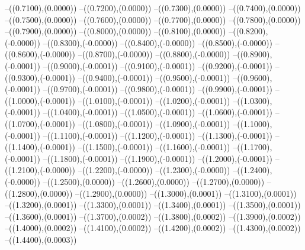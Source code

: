 {	--({\sx*(0.7100)},{\sy*(0.0000)})
	--({\sx*(0.7200)},{\sy*(0.0000)})
	--({\sx*(0.7300)},{\sy*(0.0000)})
	--({\sx*(0.7400)},{\sy*(0.0000)})
	--({\sx*(0.7500)},{\sy*(0.0000)})
	--({\sx*(0.7600)},{\sy*(0.0000)})
	--({\sx*(0.7700)},{\sy*(0.0000)})
	--({\sx*(0.7800)},{\sy*(0.0000)})
	--({\sx*(0.7900)},{\sy*(0.0000)})
	--({\sx*(0.8000)},{\sy*(0.0000)})
	--({\sx*(0.8100)},{\sy*(0.0000)})
	--({\sx*(0.8200)},{\sy*(-0.0000)})
	--({\sx*(0.8300)},{\sy*(-0.0000)})
	--({\sx*(0.8400)},{\sy*(-0.0000)})
	--({\sx*(0.8500)},{\sy*(-0.0000)})
	--({\sx*(0.8600)},{\sy*(-0.0000)})
	--({\sx*(0.8700)},{\sy*(-0.0000)})
	--({\sx*(0.8800)},{\sy*(-0.0000)})
	--({\sx*(0.8900)},{\sy*(-0.0001)})
	--({\sx*(0.9000)},{\sy*(-0.0001)})
	--({\sx*(0.9100)},{\sy*(-0.0001)})
	--({\sx*(0.9200)},{\sy*(-0.0001)})
	--({\sx*(0.9300)},{\sy*(-0.0001)})
	--({\sx*(0.9400)},{\sy*(-0.0001)})
	--({\sx*(0.9500)},{\sy*(-0.0001)})
	--({\sx*(0.9600)},{\sy*(-0.0001)})
	--({\sx*(0.9700)},{\sy*(-0.0001)})
	--({\sx*(0.9800)},{\sy*(-0.0001)})
	--({\sx*(0.9900)},{\sy*(-0.0001)})
	--({\sx*(1.0000)},{\sy*(-0.0001)})
	--({\sx*(1.0100)},{\sy*(-0.0001)})
	--({\sx*(1.0200)},{\sy*(-0.0001)})
	--({\sx*(1.0300)},{\sy*(-0.0001)})
	--({\sx*(1.0400)},{\sy*(-0.0001)})
	--({\sx*(1.0500)},{\sy*(-0.0001)})
	--({\sx*(1.0600)},{\sy*(-0.0001)})
	--({\sx*(1.0700)},{\sy*(-0.0001)})
	--({\sx*(1.0800)},{\sy*(-0.0001)})
	--({\sx*(1.0900)},{\sy*(-0.0001)})
	--({\sx*(1.1000)},{\sy*(-0.0001)})
	--({\sx*(1.1100)},{\sy*(-0.0001)})
	--({\sx*(1.1200)},{\sy*(-0.0001)})
	--({\sx*(1.1300)},{\sy*(-0.0001)})
	--({\sx*(1.1400)},{\sy*(-0.0001)})
	--({\sx*(1.1500)},{\sy*(-0.0001)})
	--({\sx*(1.1600)},{\sy*(-0.0001)})
	--({\sx*(1.1700)},{\sy*(-0.0001)})
	--({\sx*(1.1800)},{\sy*(-0.0001)})
	--({\sx*(1.1900)},{\sy*(-0.0001)})
	--({\sx*(1.2000)},{\sy*(-0.0001)})
	--({\sx*(1.2100)},{\sy*(-0.0000)})
	--({\sx*(1.2200)},{\sy*(-0.0000)})
	--({\sx*(1.2300)},{\sy*(-0.0000)})
	--({\sx*(1.2400)},{\sy*(-0.0000)})
	--({\sx*(1.2500)},{\sy*(0.0000)})
	--({\sx*(1.2600)},{\sy*(0.0000)})
	--({\sx*(1.2700)},{\sy*(0.0000)})
	--({\sx*(1.2800)},{\sy*(0.0000)})
	--({\sx*(1.2900)},{\sy*(0.0000)})
	--({\sx*(1.3000)},{\sy*(0.0001)})
	--({\sx*(1.3100)},{\sy*(0.0001)})
	--({\sx*(1.3200)},{\sy*(0.0001)})
	--({\sx*(1.3300)},{\sy*(0.0001)})
	--({\sx*(1.3400)},{\sy*(0.0001)})
	--({\sx*(1.3500)},{\sy*(0.0001)})
	--({\sx*(1.3600)},{\sy*(0.0001)})
	--({\sx*(1.3700)},{\sy*(0.0002)})
	--({\sx*(1.3800)},{\sy*(0.0002)})
	--({\sx*(1.3900)},{\sy*(0.0002)})
	--({\sx*(1.4000)},{\sy*(0.0002)})
	--({\sx*(1.4100)},{\sy*(0.0002)})
	--({\sx*(1.4200)},{\sy*(0.0002)})
	--({\sx*(1.4300)},{\sy*(0.0002)})
	--({\sx*(1.4400)},{\sy*(0.0003)})
}

